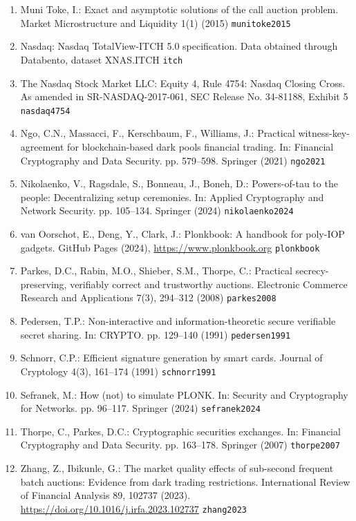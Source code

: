 \begin{enumerate}
\item
  Muni Toke, I.: Exact and asymptotic solutions of the call auction problem. Market Microstructure and Liquidity 1(1) (2015) \texttt{munitoke2015}
\item
  Nasdaq: Nasdaq TotalView-ITCH 5.0 specification. Data obtained through Databento, dataset XNAS.ITCH \texttt{itch}
\item
  The Nasdaq Stock Market LLC: Equity 4, Rule 4754: Nasdaq Closing Cross. As amended in SR-NASDAQ-2017-061, SEC Release No. 34-81188, Exhibit 5 \texttt{nasdaq4754}
\item
  Ngo, C.N., Massacci, F., Kerschbaum, F., Williams, J.: Practical witness-key-agreement for blockchain-based dark pools financial trading. In: Financial Cryptography and Data Security. pp. 579--598. Springer (2021) \texttt{ngo2021}
\item
  Nikolaenko, V., Ragsdale, S., Bonneau, J., Boneh, D.: Powers-of-tau to the people: Decentralizing setup ceremonies. In: Applied Cryptography and Network Security. pp. 105--134. Springer (2024) \texttt{nikolaenko2024}
\item
  van Oorschot, E., Deng, Y., Clark, J.: Plonkbook: A handbook for poly-IOP gadgets. GitHub Pages (2024), \url{https://www.plonkbook.org} \texttt{plonkbook}
\item
  Parkes, D.C., Rabin, M.O., Shieber, S.M., Thorpe, C.: Practical secrecy-preserving, verifiably correct and trustworthy auctions. Electronic Commerce Research and Applications 7(3), 294--312 (2008) \texttt{parkes2008}
\item
  Pedersen, T.P.: Non-interactive and information-theoretic secure verifiable secret sharing. In: CRYPTO. pp. 129--140 (1991) \texttt{pedersen1991}
\item
  Schnorr, C.P.: Efficient signature generation by smart cards. Journal of Cryptology 4(3), 161--174 (1991) \texttt{schnorr1991}
\item
  Sefranek, M.: How (not) to simulate PLONK. In: Security and Cryptography for Networks. pp. 96--117. Springer (2024) \texttt{sefranek2024}
\item
  Thorpe, C., Parkes, D.C.: Cryptographic securities exchanges. In: Financial Cryptography and Data Security. pp. 163--178. Springer (2007) \texttt{thorpe2007}
\item
  Zhang, Z., Ibikunle, G.: The market quality effects of sub-second frequent batch auctions: Evidence from dark trading restrictions. International Review of Financial Analysis 89, 102737 (2023). \url{https://doi.org/10.1016/j.irfa.2023.102737} \texttt{zhang2023}
\end{enumerate}

